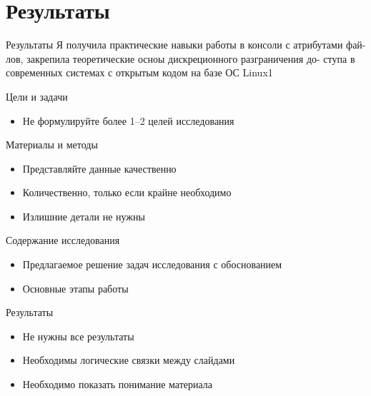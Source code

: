 \documentclass[
  ignorenonframetext,
  aspectratio=169,
]{beamer}
\providecommand{\tightlist}{%
  \setlength{\itemsep}{0pt}\setlength{\parskip}{0pt}}\usepackage{longtable,booktabs,array}
\begin{document}
\section{Результаты}\label{ux440ux435ux437ux443ux43bux44cux442ux430ux442ux44b}

\begin{frame}{Результаты}
Я получила практические навыки работы в консоли с атрибутами фай- лов,
закрепила теоретические осноы дискреционного разграничения до- ступа в
современных системах с открытым кодом на базе ОС Linux1
\end{frame}

\begin{frame}{Цели и задачи}
\label{ux446ux435ux43bux438-ux438-ux437ux430ux434ux430ux447ux438-1}
\begin{itemize}[<+->]
\tightlist
\item
  Не формулируйте более 1--2 целей исследования
\end{itemize}
\end{frame}

\begin{frame}{Материалы и методы}
\label{ux43cux430ux442ux435ux440ux438ux430ux43bux44b-ux438-ux43cux435ux442ux43eux434ux44b-1}
\begin{itemize}[<+->]
\tightlist
\item
  Представляйте данные качественно
\item
  Количественно, только если крайне необходимо
\item
  Излишние детали не нужны
\end{itemize}
\end{frame}

\begin{frame}{Содержание исследования}
\label{ux441ux43eux434ux435ux440ux436ux430ux43dux438ux435-ux438ux441ux441ux43bux435ux434ux43eux432ux430ux43dux438ux44f}
\begin{itemize}[<+->]
\tightlist
\item
  Предлагаемое решение задач исследования с обоснованием
\item
  Основные этапы работы
\end{itemize}
\end{frame}

\begin{frame}{Результаты}
\label{ux440ux435ux437ux443ux43bux44cux442ux430ux442ux44b-1}
\begin{itemize}[<+->]
\tightlist
\item
  Не нужны все результаты
\item
  Необходимы логические связки между слайдами
\item
  Необходимо показать понимание материала
\end{itemize}
\end{frame}
\end{document}
